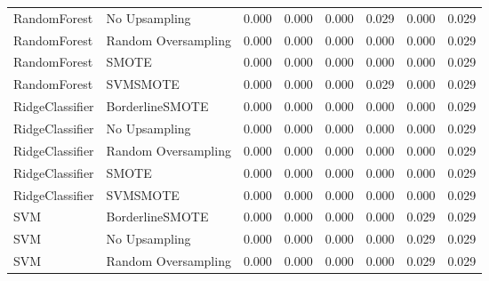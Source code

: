 \begin{tabular}{llllllll}
                RandomForest &       No Upsampling & 0.000 &                     0.000 &                 0.000 &                  0.029 &                                   0.000 &     0.029 \\
                RandomForest & Random Oversampling & 0.000 &                     0.000 &                 0.000 &                  0.000 &                                   0.000 &     0.029 \\
                RandomForest &               SMOTE & 0.000 &                     0.000 &                 0.000 &                  0.000 &                                   0.000 &     0.029 \\
                RandomForest &            SVMSMOTE & 0.000 &                     0.000 &                 0.000 &                  0.029 &                                   0.000 &     0.029 \\
             RidgeClassifier &     BorderlineSMOTE & 0.000 &                     0.000 &                 0.000 &                  0.000 &                                   0.000 &     0.029 \\
             RidgeClassifier &       No Upsampling & 0.000 &                     0.000 &                 0.000 &                  0.000 &                                   0.000 &     0.029 \\
             RidgeClassifier & Random Oversampling & 0.000 &                     0.000 &                 0.000 &                  0.000 &                                   0.000 &     0.029 \\
             RidgeClassifier &               SMOTE & 0.000 &                     0.000 &                 0.000 &                  0.000 &                                   0.000 &     0.029 \\
             RidgeClassifier &            SVMSMOTE & 0.000 &                     0.000 &                 0.000 &                  0.000 &                                   0.000 &     0.029 \\
                         SVM &     BorderlineSMOTE & 0.000 &                     0.000 &                 0.000 &                  0.000 &                                   0.029 &     0.029 \\
                         SVM &       No Upsampling & 0.000 &                     0.000 &                 0.000 &                  0.000 &                                   0.029 &     0.029 \\
                         SVM & Random Oversampling & 0.000 &                     0.000 &                 0.000 &                  0.000 &                                   0.029 &     0.029 \\

\end{tabular}
